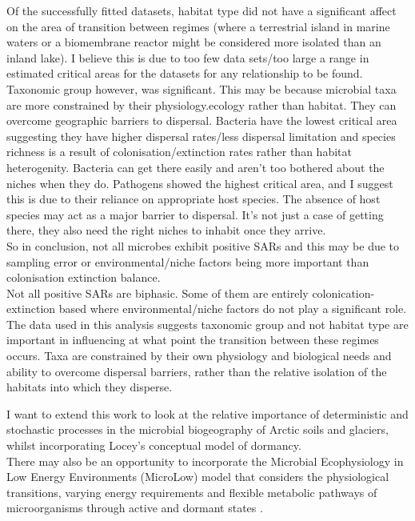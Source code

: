 \noindent Of the successfully fitted datasets, habitat type did not have a significant affect on the area of transition between regimes (where a terrestrial island in marine waters or a biomembrane reactor might be considered more isolated than an inland lake). I believe this is due to too few data sets/too large a range in estimated critical areas for the datasets for any relationship to be found. Taxonomic group however, was significant. This may be because microbial taxa are more constrained by their physiology.ecology rather than habitat. They can overcome geographic barriers to dispersal. Bacteria have the lowest critical area suggesting they have higher dispersal rates/less dispersal limitation and species richness is a result of colonisation/extinction rates rather than habitat heterogenity. Bacteria can get there easily and aren't too bothered about the niches when they do. Pathogens showed the highest critical area, and I suggest this is due to their reliance on appropriate host species. The absence of host species may act as a major barrier to dispersal. It's not just a case of getting there, they also need the right niches to inhabit once they arrive.\\

\noindent So in conclusion, not all microbes exhibit positive SARs and this may be due to sampling error or environmental/niche factors being more important than colonisation extinction balance. \\

\noindent Not all positive SARs are biphasic. Some of them are entirely colonication-extinction based where environmental/niche factors do not play a significant role.\\

\noindent The data used in this analysis suggests taxonomic group and not habitat type are important in influencing at what point the transition between these regimes occurs. Taxa are constrained by their own physiology and biological needs and ability to overcome dispersal barriers, rather than the relative isolation of the habitats into which they disperse. 

\noindent I want to extend this work to look at the relative importance of deterministic and stochastic processes in the microbial biogeography of Arctic soils and glaciers, whilst incorporating Locey's conceptual model of dormancy.   \\           

\noindent There may also be an opportunity to incorporate the Microbial Ecophysiology in Low Energy Environments (MicroLow) model that considers the physiological transitions, varying energy requirements and flexible metabolic pathways of microorganisms through active and dormant states \cite{bradley2019survival}.  \\


